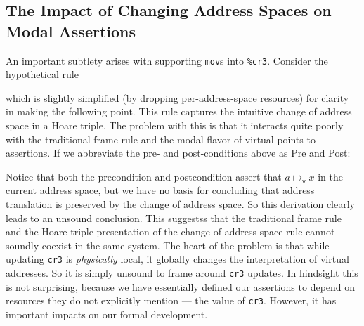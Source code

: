 \subsection{The Impact of Changing Address Spaces on Modal Assertions}
\label{sec:issues}
An important subtlety arises with supporting \lstinline|mov|s into \lstinline|%cr3|. Consider the hypothetical rule
\begin{mathpar}
\end{mathpar}
which is slightly simplified (by dropping per-address-space resources) for clarity in making the following point.
This rule captures the intuitive change of address space in a Hoare triple.
The problem with this is that it interacts quite poorly with the traditional frame
rule and the modal flavor of virtual points-to assertions.
If we abbreviate the pre- and post-conditions above as \textsf{Pre} and \textsf{Post}:
\begin{mathpar}
\end{mathpar}
Notice that both the precondition and postcondition assert that $a\mapsto_\mathsf{v} x$ in the current address space, but we have no basis for concluding that address translation is preserved by the change of address space. So this derivation clearly leads to an unsound conclusion. 
This suggestss that the traditional frame rule and the Hoare triple presentation of the change-of-address-space rule cannot soundly coexist in the same system.
The heart of the problem is that while updating \lstinline|cr3| is \emph{physically} local, it globally changes the interpretation of virtual addresses. So it is simply unsound to frame around \lstinline|cr3| updates.
In hindsight this is not surprising, because we have essentially defined
our assertions to depend on resources they do not explicitly mention --- the value of \lstinline|cr3|.
However, it has important impacts on our formal development.


